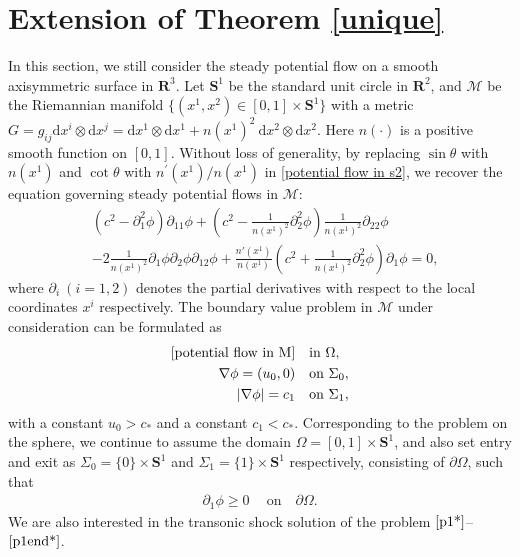 \documentclass[reqno,12pt]{amsart}
\newcommand{\dd}{\mathrm{d}}
\numberwithin{equation}{section}
\begin{document}
\section{Extension of  Theorem \ref{unique}}\label{sec3}
In this section, we still consider the steady potential flow on a smooth axisymmetric surface in $\mathbf{R}^3$. Let $\mathbf{S}^1$ be the standard unit circle in $\mathbf{R}^2$, and $\mathcal{M}$ be the Riemannian manifold $\{(x^1, x^2)\in [0, 1]\times \mathbf{S}^1 \}$ with a metric
$G=g_{ij}\dd x^i\otimes\dd x^j=\dd x^1\otimes\dd x^1+n(x^1)^2~\dd x^2\otimes\dd x^2$. Here $n(\cdot)$ is a positive smooth function on $[0,1]$.
Without loss of generality, by replacing $\sin\theta$ with $n(x^1)$ and $\cot\theta$ with $n^\prime(x^1)/n(x^1)$ in \eqref{potential flow in s2}, we recover the equation governing steady potential flows in $\mathcal{M}$:
\begin{align}\label{potential flow in M}
	&(c^2-\partial^2_1 \phi)\partial_{11}\phi+(c^2-\frac{1}{n(x^1)^2 }\partial^2_2\phi)\frac{1}{n(x^1)^2 }\partial_{22}\phi\nonumber\\
	&-2\frac{1}{n(x^1)^2 }\partial_{1}\phi\partial_{2}\phi\partial_{12}\phi+\frac{n'(x^1)}{n(x^1)}(c^2+\frac{1}{n(x^1)^2}\partial^2_2\phi)\partial_{1}\phi=0,
\end{align}
where $\partial_i~(i=1,2)$ denotes the partial derivatives with respect to the local coordinates $x^i$ respectively. The boundary value problem in $\mathcal{M}$ under consideration can be formulated as
	\begin{align}\label{p1*}
			\eqref{potential flow in M} \quad &\text{in}~\Omega,\\
		\nabla\phi=(u_0,0) \quad &\text{on}~\Sigma_0,\label{sigma0con*}\\
		|\nabla \phi|=c_{1 } \quad &\text{on}~\Sigma_1,\label{p1end*}
	\end{align}
with a constant $u_0>c_{*}$ and a constant $c_{1 }<c_{*}$. Corresponding to the problem on the sphere, we continue to assume the domain $\Omega= [0, 1]\times \mathbf{S}^1$, and also set entry and exit as $\Sigma_0=\{0\}\times \mathbf{S}^1$ and $\Sigma_1=\{1\}\times\mathbf{S}^1$ respectively, consisting of $\partial\Omega$, such that 
	\begin{align}\label{h1*}
		\partial_1\phi\geq0 ~\quad \text{on}\quad\partial\Omega.
	\end{align}
We are also interested in the transonic shock solution of the problem $\eqref{p1*}$--$\eqref{p1end*}$. 
	
\end{document}
